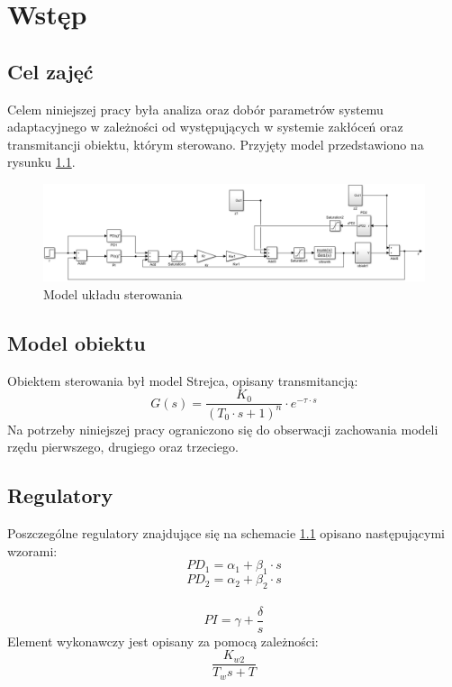 \chapter{Wstęp}

\section{Cel zajęć}
Celem niniejszej pracy była analiza oraz dobór parametrów systemu adaptacyjnego w zależności od występujących w systemie zakłóceń oraz transmitancji obiektu, którym sterowano. Przyjęty model przedstawiono na rysunku \ref{model_systemu}.

\begin{figure}[h!]
	\centering
	\includegraphics[scale = 0.6]{fig/model_systemu.png}
	\caption		
	{Model układu sterowania}
	\label{model_systemu}
\end{figure} 

\section{Model obiektu}

Obiektem sterowania był model Strejca, opisany  transmitancją:
\begin{equation}\label{key}
G(s) = \dfrac{K_0}{(T_0 \cdot s + 1)^n} \cdot e^{-\tau \cdot s} 
\end{equation}
Na potrzeby niniejszej pracy ograniczono się do obserwacji zachowania modeli rzędu pierwszego, drugiego oraz trzeciego.

\section{Regulatory}
Poszczególne regulatory znajdujące się na schemacie \ref{model_systemu} opisano następującymi wzorami: 
\begin{equation}\label{reg1}
PD_1 = \alpha_1+\beta_1 \cdot s
\end{equation}
\begin{equation}\label{reg2}
PD_2 = \alpha_2+\beta_2 \cdot s
\end{equation}\\
\begin{equation}\label{reg3}
PI = \gamma + \dfrac{\delta}{s}
\end{equation}
Element wykonawczy jest opisany za pomocą zależności:
\begin{equation}\label{actuator}
\dfrac{K_{w2}}{T_w s+T}
\end{equation}

